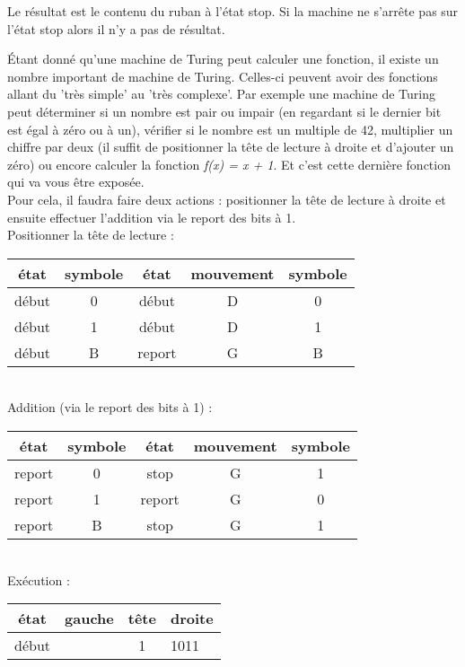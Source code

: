  Le résultat est le contenu du ruban à l'état stop. Si la machine
ne s'arrête pas sur l'état stop alors il n'y a pas de résultat.

\begin{myexem}
Étant donné qu'une machine de Turing peut calculer une fonction, il existe un nombre important de machine de Turing. Celles-ci peuvent avoir des fonctions allant du 'très simple' au 'très complexe'. Par exemple une machine de Turing peut déterminer si un nombre est pair ou impair (en regardant si le dernier bit est égal à zéro ou à un), vérifier si le nombre est un multiple de 42, multiplier un chiffre par deux (il suffit de positionner la tête de lecture à droite et d'ajouter un zéro) ou encore calculer la fonction \textit{f(x) = x + 1}. Et c'est cette dernière fonction qui va vous être exposée.\\
Pour cela, il faudra faire deux actions : positionner la tête de lecture à droite et ensuite effectuer l'addition via le report des bits à 1.
\vspace{4pt} \\
Positionner la tête de lecture : \\
\begin{tabular}{|c|c|c|c|c|}
\hline
 état & symbole & état & mouvement & symbole \\\hline
 début & 0 & début & D & 0 \\ \hline
 début & 1 & début & D & 1 \\ \hline
 début & B & report & G & B \\ \hline
\end{tabular}
\vspace{4pt}
\\
Addition (via le report des bits à 1) : \\
\begin{tabular}{|c|c|c|c|c|}
\hline
 état & symbole & état & mouvement & symbole \\\hline
 report & 0 & stop & G & 1 \\ \hline
 report & 1 & report & G & 0 \\ \hline
 report & B & stop & G & 1 \\ \hline
\end{tabular}
\vspace{4pt}
\\
Exécution : \\
\begin{tabular}{|c|r|c|l|}
\hline
 état & gauche & tête & droite \\\hline
 début &  & 1 & 1011 \\ \hline

\end{tabular}
\end{myexem}
